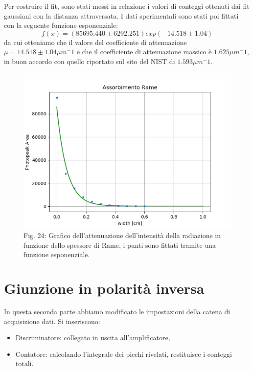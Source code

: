 \documentclass[a4paper]{article}
\begin{document}
Per costruire il fit, sono stati messi in relazione i valori di conteggi ottenuti dai fit gaussiani con la distanza attraversata. I dati sperimentali sono stati poi fittati con la seguente funzione esponenziale:
\begin{equation}
f(x)= (85695.440 \pm 6292.251)exp(-14.518 \pm 1.04)
\end{equation}
da cui otteniamo che il valore del coefficiente di attenuazione $\mu =14.518 \pm 1.04  \mu m^-1 $ e che il coefficiente di attenuazione massico è $ 1.625 \mu m^-1$, in buon accordo con quello riportato sul sito del NIST di $1.593 \mu m^-1$.
\begin{figure}[H]
\includegraphics[width=1\textwidth]{assorbimento_rame}
        \caption{Fig. 24: Grafico dell'attenuazione dell'intensità della radiazione in funzione dello spessore di Rame, i punti sono fittati tramite una funzione esponenziale.}
        \label{fig:24}
\end{figure}

\section{Giunzione in polarità inversa}
In questa seconda parte abbiamo modificato le impostazioni della catena di acquisizione dati. Si inseriscono:
\begin{itemize}
\item Discriminatore: collegato in uscita all’amplificatore,
\item Contatore: calcolando l’integrale dei picchi rivelati, restituisce i conteggi totali.
\end{itemize}
\end{document}
